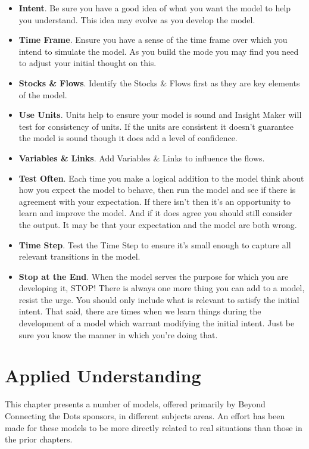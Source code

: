 \documentclass[]{memoir}
\begin{document}
\begin{itemize}
\itemsep1pt\parskip0pt
\item
  \textbf{Intent}. Be sure you have a good idea of what you want the
  model to help you understand. This idea may evolve as you develop the
  model.
\item
  \textbf{Time Frame}. Ensure you have a sense of the time frame over
  which you intend to simulate the model. As you build the mode you may
  find you need to adjust your initial thought on this.
\item
  \textbf{Stocks \& Flows}. Identify the Stocks \& Flows first as they
  are key elements of the model.
\item
  \textbf{Use Units}. Units help to ensure your model is sound and
  Insight Maker will test for consistency of units. If the units are
  consistent it doesn't guarantee the model is sound though it does add
  a level of confidence.
\item
  \textbf{Variables \& Links}. Add Variables \& Links to influence the
  flows.
\item
  \textbf{Test Often}. Each time you make a logical addition to the
  model think about how you expect the model to behave, then run the
  model and see if there is agreement with your expectation. If there
  isn't then it's an opportunity to learn and improve the model. And if
  it does agree you should still consider the output. It may be that
  your expectation and the model are both wrong.
\item
  \textbf{Time Step}. Test the Time Step to ensure it's small enough to
  capture all relevant transitions in the model.
\item
  \textbf{Stop at the End}. When the model serves the purpose for which
  you are developing it, STOP! There is always one more thing you can
  add to a model, resist the urge. You should only include what is
  relevant to satisfy the initial intent. That said, there are times
  when we learn things during the development of a model which warrant
  modifying the initial intent. Just be sure you know the manner in
  which you're doing that.
\end{itemize}

\chapter{Applied Understanding}

This chapter presents a number of models, offered primarily by Beyond
Connecting the Dots sponsors, in different subjects areas. An effort has
been made for these models to be more directly related to real
situations than those in the prior chapters.
\end{document}
